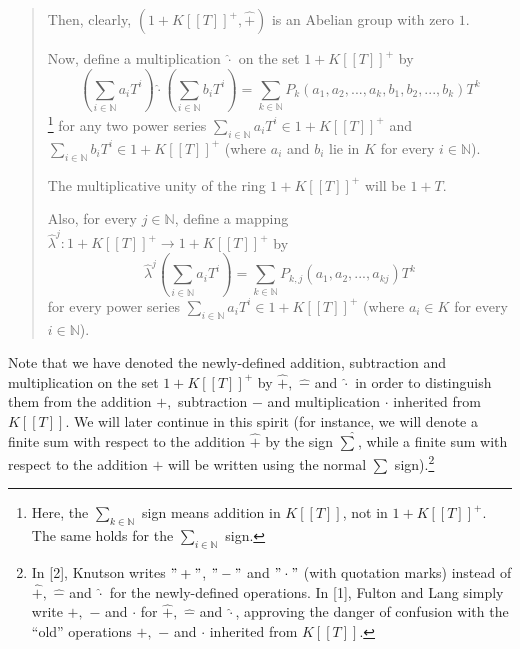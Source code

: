 \documentclass[numbers=enddot,12pt,final,onecolumn,notitlepage]{scrartcl}%
\begin{document}
\begin{quote}
Then, clearly, $\left(  1+K\left[  \left[  T\right]  \right]  ^{+}%
,\widehat{+}\right)  $ is an Abelian group with zero $1$.

Now, define a multiplication $\widehat{\cdot}$ on the set $1+K\left[  \left[
T\right]  \right]  ^{+}$ by%
\[
\left(  \sum_{i\in\mathbb{N}}a_{i}T^{i}\right)  \widehat{\cdot}\left(
\sum_{i\in\mathbb{N}}b_{i}T^{i}\right)  =\sum_{k\in\mathbb{N}}P_{k}\left(
a_{1},a_{2},...,a_{k},b_{1},b_{2},...,b_{k}\right)  T^{k}%
\]
\footnote{Here, the $\sum\limits_{k\in\mathbb{N}}$ sign means addition in
$K\left[  \left[  T\right]  \right]  $, not in $1+K\left[  \left[  T\right]
\right]  ^{+}$. The same holds for the $\sum\limits_{i\in\mathbb{N}}$ sign.}
for any two power series $\sum\limits_{i\in\mathbb{N}}a_{i}T^{i}\in1+K\left[
\left[  T\right]  \right]  ^{+}$ and $\sum\limits_{i\in\mathbb{N}}b_{i}%
T^{i}\in1+K\left[  \left[  T\right]  \right]  ^{+}$ (where $a_{i}$ and $b_{i}$
lie in $K$ for every $i\in\mathbb{N}$).

The multiplicative unity of the ring $1+K\left[  \left[  T\right]  \right]
^{+}$ will be $1+T$.

Also, for every $j\in\mathbb{N}$, define a mapping $\widehat{\lambda}%
^{j}:1+K\left[  \left[  T\right]  \right]  ^{+}\rightarrow1+K\left[  \left[
T\right]  \right]  ^{+}$ by%
\[
\widehat{\lambda}^{j}\left(  \sum_{i\in\mathbb{N}}a_{i}T^{i}\right)
=\sum_{k\in\mathbb{N}}P_{k,j}\left(  a_{1},a_{2},...,a_{kj}\right)  T^{k}%
\]
for every power series $\sum\limits_{i\in\mathbb{N}}a_{i}T^{i}\in1+K\left[
\left[  T\right]  \right]  ^{+}$ (where $a_{i}\in K$ for every $i\in
\mathbb{N}$).
\end{quote}

Note that we have denoted the newly-defined addition, subtraction and
multiplication on the set $1+K\left[  \left[  T\right]  \right]  ^{+}$ by
$\widehat{+},$ $\widehat{-}$ and $\widehat{\cdot}$ in order to distinguish
them from the addition $+,$ subtraction $-$ and multiplication $\cdot$
inherited from $K\left[  \left[  T\right]  \right]  $. We will later continue
in this spirit (for instance, we will denote a finite sum with respect to the
addition $\widehat{+}$ by the sign $\widehat{\sum}$, while a finite sum with
respect to the addition $+$ will be written using the normal $\sum$
sign).\footnote{In [2], Knutson writes $"+"$, $"-"$ and $"\cdot"$ (with
quotation marks) instead of $\widehat{+},$ $\widehat{-}$ and $\widehat{\cdot}$
for the newly-defined operations. In [1], Fulton and Lang simply write $+,$
$-$ and $\cdot$ for $\widehat{+},$ $\widehat{-}$ and $\widehat{\cdot}$,
approving the danger of confusion with the ``old'' operations $+,$ $-$ and
$\cdot$ inherited from $K\left[  \left[  T\right]  \right]  $.}
\end{document}
